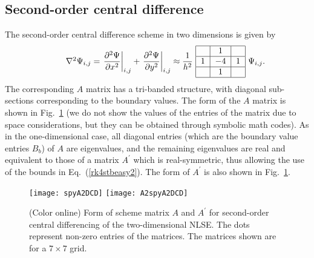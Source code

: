 \documentclass{article}
\begin{document}
\subsection{Second-order central difference}
\label{s:2dcdstb}
The second-order central difference scheme in two dimensions is given by
\begin{equation}
\begin{tabular}{c} 
$\qquad \nabla^2 \Psi_{i,j} = \left. \dfrac{\partial^2 \Psi}{\partial x^2} \right|_{i,j} + \left. \dfrac{\partial^2 \Psi}{\partial y^2} \right|_{i,j} \approx \dfrac{1}{h^2}$
\begin{tabular}{|c|c|c|} \hline
  &  $1$ &   \\ \hline
$1$ & $-4$ & $1$ \\ \hline
  &  $1$ &  \\ \hline
\end{tabular}
$\Psi_{i,j}.$
\end{tabular}
\end{equation}
The corresponding $A$ matrix has a tri-banded structure, with diagonal sub-sections corresponding to the boundary values.  The form of the $A$ matrix is shown in Fig.~\ref{f:A2D} (we do not show the values of the entries of the matrix due to space considerations, but they can be obtained through symbolic math codes).  As in the one-dimensional case, all diagonal entries (which are the boundary value entries $B_b$) of $A$ are eigenvalues, and the remaining eigenvalues are real and equivalent to those of a matrix $A^{\prime}$ which is real-symmetric, thus allowing the use of the bounds in Eq.~(\ref{rk4stbeasy2}).  The form of $A^\prime$ is also shown in Fig.~\ref{f:A2D}.
\begin{figure}[htbp]
\centering
\texttt{[image: spyA2DCD]}
\texttt{[image: A2spyA2DCD]}
\caption[Matrix structure for two-dimensional CD scheme.]{(Color online) Form of scheme matrix $A$ and $A^{\prime}$ for second-order central differencing of the two-dimensional NLSE.  The dots represent non-zero entries of the matrices.  The matrices shown are for a $7\times 7$ grid. \label{f:A2D}}
\end{figure}
\end{document}
